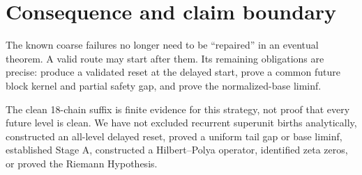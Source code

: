 \documentclass[12pt]{article}
\begin{document}
\section{Consequence and claim boundary}
The known coarse failures no longer need to be ``repaired'' in an eventual
theorem.  A valid route may start after them.  Its remaining obligations are
precise: produce a validated reset at the delayed start, prove a common future
block kernel and partial safety gap, and prove the normalized-base liminf.

The clean 18-chain suffix is finite evidence for this strategy, not proof
that every future level is clean.  We have not excluded recurrent superunit
births analytically, constructed an all-level delayed reset, proved a uniform
tail gap or base liminf, established Stage A, constructed a Hilbert--Polya
operator, identified zeta zeros, or proved the Riemann Hypothesis.



\end{document}
